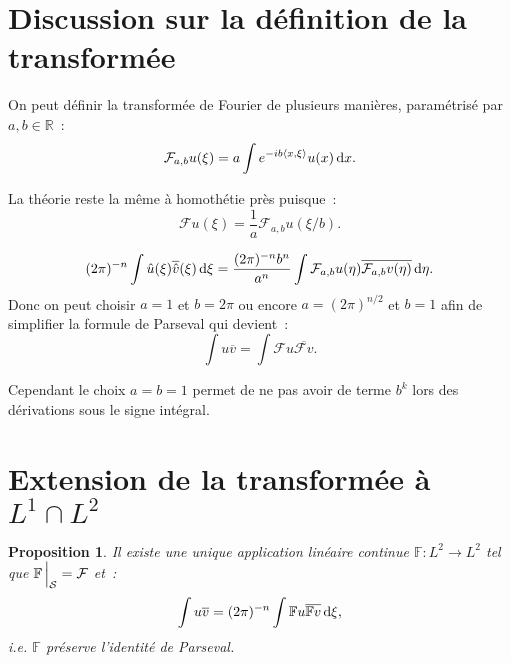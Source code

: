 \documentclass{report}
\newcommand{\R}{{\mathbb R}}
\newcommand{\scpr}[2]{\left\langle#1, #2\right\rangle}
\newcommand{\dx}{\dif x}
\newtheorem{prp}[thm]{Proposition}
\theoremstyle{definition}
\theoremstyle{remark}
\begin{document}
\section{Discussion sur la définition de la transformée}

On peut définir la transformée de Fourier de plusieurs manières, paramétrisé par $a, b \in \R$~:
\[\mathcal F_{a,b}u(\xi) = a\int e^{-ib\scpr x\xi}u(x)\dx.\]

La théorie reste la même à homothétie près puisque~:
\[\mathcal Fu(\xi) = \frac 1a\mathcal F_{a,b}u(\xi/b).\]

\[(2\pi)^{-n}\int \hat u(\xi)\overline {\hat v}(\xi)\dif\xi = \frac {(2\pi)^{-n}b^n}{a^n}\int\mathcal F_{a,b}u(\eta)\overline {\mathcal F_{a,b}v(\eta)}\dif\eta.\]
Donc on peut choisir $a=1$ et $b=2\pi$ ou encore $a=(2\pi)^{n/2}$ et $b=1$ afin de simplifier la formule de Parseval qui devient~:
\[\int u\overline v = \int \mathcal Fu\overline {\mathcal Fv}.\]

Cependant le choix $a=b=1$ permet de ne pas avoir de terme $b^k$ lors des dérivations sous le signe intégral.

\section{Extension de la transformée à $L^1 \cap L^2$}

\begin{prp} Il existe une unique application linéaire continue $\mathbb F : L^2 \to L^2$ tel que $\mathbb F\sVert[2]_{\mathcal S} = \mathcal F$ et~:
\[\int u\overline v = (2\pi)^{-n}\int \mathbb Fu\overline {\mathbb Fv}\dif\xi,\]
i.e. $\mathbb F$ préserve l'identité de Parseval.
\end{prp}
\end{document}
